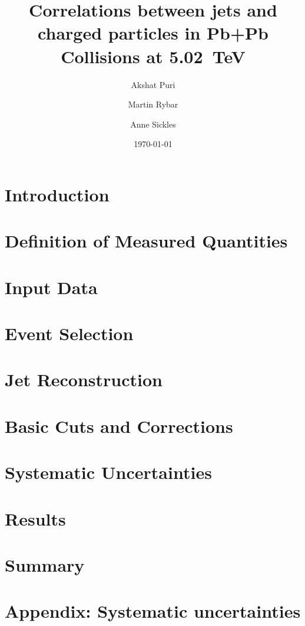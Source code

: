 \documentclass[11pt,a4paper]{atlasnote}
\title{Correlations between jets and charged particles in Pb+Pb Collisions at 5.02~TeV}
\author[a]{Akshat Puri}
\author[a]{Martin Rybar}
\author[a]{Anne Sickles}
\affil[a]{University of Illinois at Urbana-Champaign}
\date{\today}
\begin{document}
\newpage

\tableofcontents
\newpage

\section{Introduction}
\label{sec:intro}

\section{Definition of Measured Quantities}
\label{sec:trkjet_corr_measurement}

\clearpage
\section{Input Data}
\label{sec:used_data}

\section{Event Selection }
\label{sec:event_selection}

\clearpage
\section{Jet Reconstruction}
\label{sec:reconstruction}

\clearpage
\section{Basic Cuts and Corrections}
\label{sec:cuts_corrections}

\clearpage
\section{Systematic Uncertainties}
\label{Sec:systematic}

\clearpage
\section{Results}
\label{sec:results}

\clearpage
\section{Summary}
\label{sec:summary}

\clearpage\appendix
\section{Appendix: Systematic uncertainties}
\label{sec:appendixA}

\clearpage

\clearpage


\clearpage


\appendix
\end{document}
